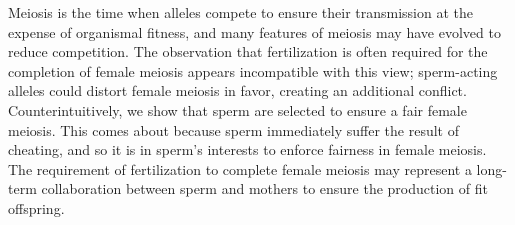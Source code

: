 \documentclass{article}
\begin{document}
Meiosis is the time when alleles compete to ensure their transmission at the expense of organismal fitness, and many features of meiosis may have evolved to reduce competition. The observation that fertilization is often required for the completion of female meiosis appears incompatible with this view; sperm-acting alleles could distort female meiosis in favor, creating an additional conflict. Counterintuitively, we show that sperm are selected to ensure a fair female meiosis. This comes about because sperm immediately suffer the result of cheating, and so it is in sperm's interests to enforce fairness in female meiosis.  The requirement of fertilization to complete female meiosis may represent a long-term collaboration between sperm and mothers to ensure the production of fit offspring.
\end{document}
